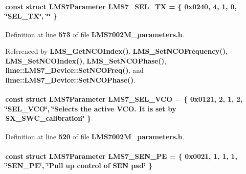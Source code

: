 \paragraph[{L\+M\+S7\+\_\+\+S\+E\+L\+\_\+\+TX}]{\setlength{\rightskip}{0pt plus 5cm}const struct {\bf L\+M\+S7\+Parameter} L\+M\+S7\+\_\+\+S\+E\+L\+\_\+\+TX = \{ 0x0240, 4, 1, 0, \char`\"{}\+S\+E\+L\+\_\+\+T\+X\char`\"{}, \char`\"{}\char`\"{} \}\hspace{0.3cm}{\ttfamily [static]}}\label{LMS7002M__parameters_8h_a5138717962bfed0775fc83ea28177533}


Definition at line {\bf 573} of file {\bf L\+M\+S7002\+M\+\_\+parameters.\+h}.



Referenced by {\bf L\+M\+S\+\_\+\+Get\+N\+C\+O\+Index()}, {\bf L\+M\+S\+\_\+\+Set\+N\+C\+O\+Frequency()}, {\bf L\+M\+S\+\_\+\+Set\+N\+C\+O\+Index()}, {\bf L\+M\+S\+\_\+\+Set\+N\+C\+O\+Phase()}, {\bf lime\+::\+L\+M\+S7\+\_\+\+Device\+::\+Set\+N\+C\+O\+Freq()}, and {\bf lime\+::\+L\+M\+S7\+\_\+\+Device\+::\+Set\+N\+C\+O\+Phase()}.

\paragraph[{L\+M\+S7\+\_\+\+S\+E\+L\+\_\+\+V\+CO}]{\setlength{\rightskip}{0pt plus 5cm}const struct {\bf L\+M\+S7\+Parameter} L\+M\+S7\+\_\+\+S\+E\+L\+\_\+\+V\+CO = \{ 0x0121, 2, 1, 2, \char`\"{}\+S\+E\+L\+\_\+\+V\+C\+O\char`\"{}, \char`\"{}\+Selects the active V\+C\+O. It is set by S\+X\+\_\+\+S\+W\+C\+\_\+calibration\char`\"{} \}\hspace{0.3cm}{\ttfamily [static]}}\label{LMS7002M__parameters_8h_a928a6b9438bd5e7e43efb85f66d7084b}


Definition at line {\bf 520} of file {\bf L\+M\+S7002\+M\+\_\+parameters.\+h}.

\paragraph[{L\+M\+S7\+\_\+\+S\+E\+N\+\_\+\+PE}]{\setlength{\rightskip}{0pt plus 5cm}const struct {\bf L\+M\+S7\+Parameter} L\+M\+S7\+\_\+\+S\+E\+N\+\_\+\+PE = \{ 0x0021, 1, 1, 1, \char`\"{}\+S\+E\+N\+\_\+\+P\+E\char`\"{}, \char`\"{}\+Pull up control of S\+E\+N pad\char`\"{} \}\hspace{0.3cm}{\ttfamily [static]}}\label{LMS7002M__parameters_8h_aef3cea07e35cdcc45d37c8034cf09fa0}


